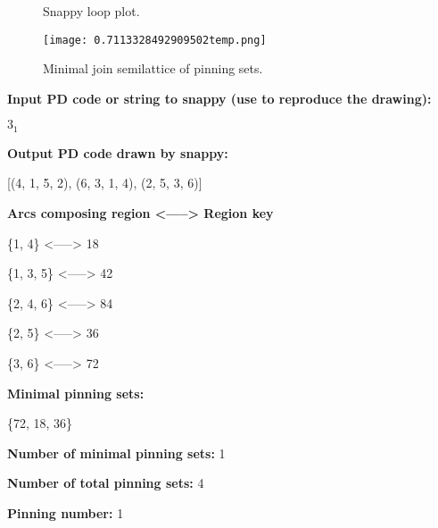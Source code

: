 \documentclass{article}%
\begin{document}
\begin{multicols}{2}
\begin{figure}[H]
\centering

\caption{Snappy loop plot.}
\label{fig:0.4024370720502499temp.svg}
\end{figure}\columnbreak

\begin{figure}[H]
\centering
\texttt{[image: 0.7113328492909502temp.png]}
\caption{Minimal join semilattice of pinning sets.}
\label{fig:0.7113328492909502temp.png}
\end{figure}\end{multicols}\newpage\begin{multicols}{2}
\textbf{Input PD code or string to snappy (use to reproduce the drawing):}

	$3_1$

\textbf{Output PD code drawn by snappy:}

	[(4, 1, 5, 2), (6, 3, 1, 4), (2, 5, 3, 6)]


\textbf{Arcs composing region <-----> Region key}

\{{1, 4}\} <-----> 18

\{{1, 3, 5}\} <-----> 42

\{{2, 4, 6}\} <-----> 84

\{{2, 5}\} <-----> 36

\{{3, 6}\} <-----> 72


\columnbreak

\textbf{Minimal pinning sets:}

\{{72, 18, 36}\}



\textbf{Number of minimal pinning sets:} 1

\textbf{Number of total pinning sets:} 4

\textbf{Pinning number:} 1


\end{multicols}
\end{document}
